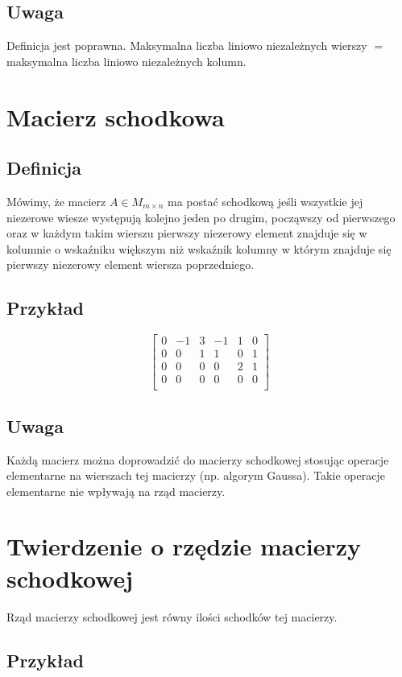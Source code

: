\documentclass[11pt]{article}
\begin{document}
\subsection{Uwaga}
Definicja jest poprawna. Maksymalna liczba liniowo niezależnych wierszy $=$ maksymalna liczba liniowo niezależnych kolumn.

\section{Macierz schodkowa}
\subsection{Definicja}
Mówimy, że macierz $A \in M_{m \times n}$ ma postać schodkową jeśli wszystkie jej niezerowe wiesze występują kolejno jeden po drugim, począwszy od pierwszego oraz w każdym takim wierszu pierwszy niezerowy element znajduje się w kolumnie o wskaźniku większym niż wskaźnik kolumny w którym znajduje się pierwszy niezerowy element wiersza poprzedniego.
\subsection{Przykład}
$$\begin{bmatrix}
	0 & -1 & 3 & -1 & 1 & 0\\
	0 & 0 & 1 & 1 & 0 & 1\\
	0 & 0 & 0 & 0 & 2 & 1 \\
	0 & 0 & 0 & 0 & 0 & 0\\
\end{bmatrix}$$

\subsection{Uwaga}
Każdą macierz można doprowadzić do macierzy schodkowej stosując operacje elementarne na wierszach tej macierzy (np. algorym Gaussa). Takie operacje elementarne nie wpływają na rząd macierzy.

\section{Twierdzenie o rzędzie macierzy schodkowej}
Rząd macierzy schodkowej jest równy ilości schodków tej macierzy.
\subsection{Przykład}
\end{document}
